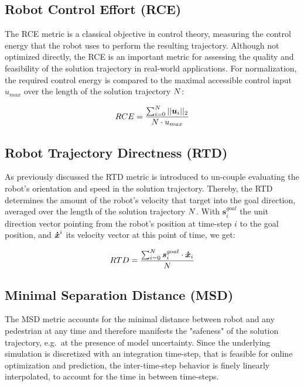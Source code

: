 \subsection{Robot Control Effort (RCE)}
The RCE metric is a classical objective in control theory, measuring the control energy that the robot uses to perform the resulting trajectory. Although not optimized directly, the RCE is an important metric for assessing the quality and feasibility of the solution trajectory in real-world applications. For normalization, the required control energy is compared to the maximal accessible control input $u_{max}$ over the length of the solution trajectory $N$:

\begin{equation}
RCE = \frac{\sum_{i = 0}^{N} ||\boldsymbol{u}_i||_2}{N \cdot u_{max}}
\end{equation}

\subsection{Robot Trajectory Directness (RTD)}
As previously discussed the RTD metric is introduced to un-couple evaluating the robot's orientation and speed in the solution trajectory. Thereby, the RTD determines the amount of the robot's velocity that target into the goal direction, averaged over the length of the solution trajectory $N$. With $\boldsymbol{s}_i^{goal}$ the unit direction vector pointing from the robot's position at time-step $i$ to the goal position, and $\boldsymbol{\dot{x}}^i$ its velocity vector at this point of time, we get:

\begin{equation}
RTD = \frac{\sum_{i=0}^{N} \boldsymbol{s}_i^{goal} \cdot \boldsymbol{\dot{x}}_i}{N}
\end{equation}

\subsection{Minimal Separation Distance (MSD)}
The MSD metric accounts for the minimal distance between robot and any pedestrian at any time and therefore manifests the "safeness" of the solution trajectory, e.g.\ at the presence of model uncertainty. Since the underlying simulation is discretized with an integration time-step, that is feasible for online optimization and prediction, the inter-time-step behavior is finely linearly interpolated, to account for the time in between time-steps.

